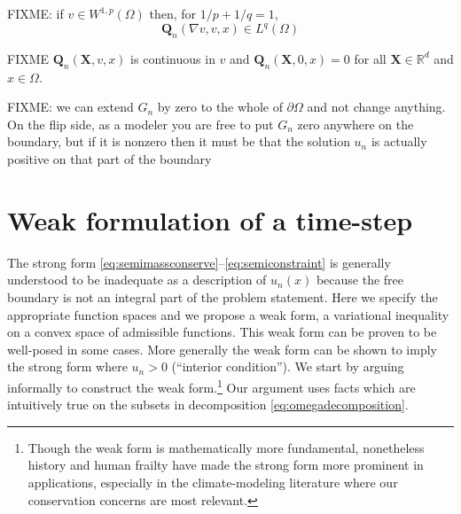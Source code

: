 \documentclass[final,leqno,onefignum,onetabnum]{siamltex1213bueler}
\newcommand\bQ{\mathbf{Q}}
\newcommand\bX{\mathbf{X}}
\renewcommand{\grad}{\nabla}
\newcommand\RR{\mathbb{R}}
\begin{document}
FIXME: if $v \in W^{1,p}(\Omega)$ then, for $1/p + 1/q = 1$,
\begin{equation}
\bQ_n(\grad v,v,x) \in L^q(\Omega) \label{eq:QisLq}
\end{equation}
 

FIXME $\bQ_n(\bX,v,x)$ is continuous in $v$ and $\bQ_n(\bX,0,x)=0$ for all $\bX\in\RR^d$ and $x\in\Omega$.

FIXME: we can extend $G_n$ by zero to the whole of $\partial \Omega$ and not change anything.  On the flip side, as a modeler you are free to put $G_n$ zero anywhere on the boundary, but if it is nonzero then it must be that the solution $u_n$ is actually positive on that part of the boundary


\section{Weak formulation of a time-step}  \label{sec:weakform}

The strong form \eqref{eq:semimassconserve}--\eqref{eq:semiconstraint} is generally understood to be inadequate as a description of $u_n(x)$ because the free boundary is not an integral part of the problem statement.  Here we specify the appropriate function spaces and we propose a weak form, a variational inequality \cite{Friedman,KinderlehrerStampacchia} on a convex space of admissible functions.  This weak form can be proven to be well-posed in some cases.  More generally the weak form can be shown to imply the strong form where $u_n>0$ (``interior condition'').  We start by arguing informally to construct the weak form.\footnote{Though the weak form is mathematically more fundamental, nonetheless history and human frailty have made the strong form more prominent in applications, especially in the climate-modeling literature where our conservation concerns are most relevant.}  Our argument uses facts which are intuitively true on the subsets in decomposition \eqref{eq:omegadecomposition}.
\end{document}
